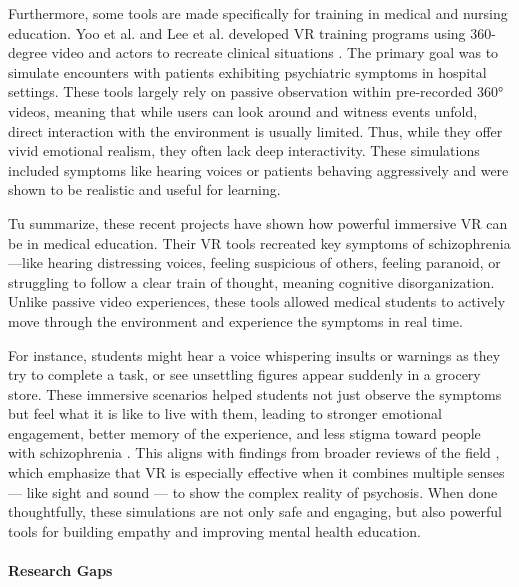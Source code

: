 \vspace{1em}

Furthermore, some tools are made specifically for training in medical and nursing education. Yoo et al. and Lee et al. developed VR training programs using 360-degree video and actors to recreate clinical situations \cite{Yoo2020, Lee2020}. The primary goal was to simulate encounters with patients exhibiting psychiatric symptoms in hospital settings. These tools largely rely on passive observation within pre-recorded 360° videos, meaning that while users can look around and witness events unfold, direct interaction with the environment is usually limited. Thus, while they offer vivid emotional realism, they often lack deep interactivity. These simulations included symptoms like hearing voices or patients behaving aggressively and were shown to be realistic and useful for learning.

\vspace{1em}

Tu summarize, these recent projects have shown how powerful immersive VR can be in medical education. Their VR tools recreated key symptoms of schizophrenia—like hearing distressing voices, feeling suspicious of others, feeling paranoid, or struggling to follow a clear train of thought, meaning cognitive disorganization. Unlike passive video experiences, these tools allowed medical students to actively move through the environment and experience the symptoms in real time.

For instance, students might hear a voice whispering insults or warnings as they try to complete a task, or see unsettling figures appear suddenly in a grocery store. These immersive scenarios helped students not just observe the symptoms but feel what it is like to live with them, leading to stronger emotional engagement, better memory of the experience, and less stigma toward people with schizophrenia \cite{Kuhail2022,Domnick2023}. This aligns with findings from broader reviews of the field \cite{Lan2023,Bisso2020}, which emphasize that VR is especially effective when it combines multiple senses — like sight and sound — to show the complex reality of psychosis. When done thoughtfully, these simulations are not only safe and engaging, but also powerful tools for building empathy and improving mental health education.

\paragraph{Research Gaps}

